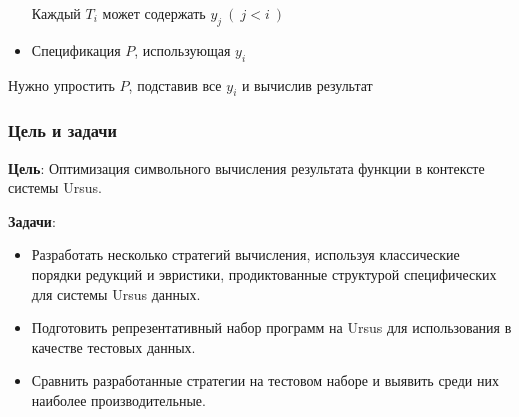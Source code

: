 \documentclass{beamer}
\begin{document}
\begin{frame}[containsverbatim]
\begin{itemize}
    Каждый $T_i$ может содержать $y_j\ (\ j < i\ )$
    \item Спецификация $P$, использующая $y_i$
  \end{itemize}
  \bigskip
  Нужно упростить $P$, подставив все $y_i$ и вычислив результат
\end{frame}

\begin{frame}\frametitle{Цель и задачи}
\textbf{Цель}: Оптимизация символьного вычисления результата функции в контексте системы Ursus.

\textbf{Задачи}:
\begin{itemize}
	\item Разработать несколько стратегий вычисления, используя классические порядки редукций и эвристики, продиктованные структурой специфических для системы Ursus данных.
	\item Подготовить репрезентативный набор программ на Ursus для использования в качестве тестовых данных.
	\item Сравнить разработанные стратегии на тестовом наборе и выявить среди них наиболее производительные.
\end{itemize}
\end{frame}

\newenvironment{megaalgorithm}[1][htb]{
    \floatname{algorithm}{\tiny Стратегия}%
   \begin{algorithm}[H]
  }{\end{algorithm}}
  \renewcommand{\algorithmname}{}
\end{document}
